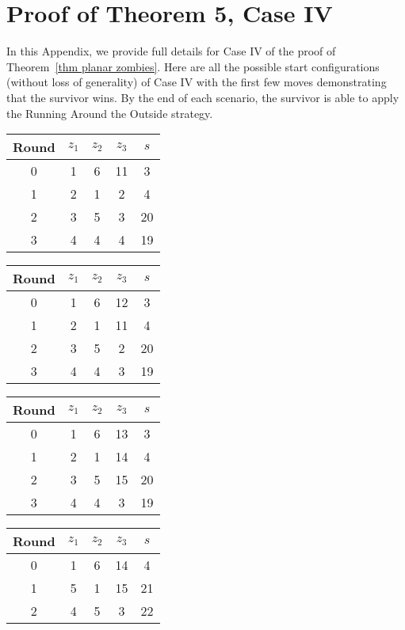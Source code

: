 \chapter{Proof of Theorem 5, Case IV}\label{appendix:planarZombies}

In this Appendix, we provide full details for Case IV of the proof of Theorem~\ref{thm planar zombies}.
Here are all the possible start configurations (without loss of generality) of Case IV with the first few moves demonstrating that the survivor wins.
By the end of each scenario, the survivor is able to apply the Running Around the Outside strategy.

\begin{multicols}{2}

\begin{tabular}{c | c | c | c | c }
Round & $z_1$ & $z_2$ & $z_3$ & $s$ \\
\hline
0 & 1 & 6 & 11 & 3 \\
1 & 2 & 1 & 2 & 4 \\
2 & 3 & 5 & 3 & 20 \\
3 & 4 & 4 & 4 & 19
\end{tabular}


\begin{tabular}{c | c | c | c | c }
Round & $z_1$ & $z_2$ & $z_3$ & $s$ \\
\hline
0 & 1 & 6 & 12 & 3 \\
1 & 2 & 1 & 11 & 4 \\
2 & 3 & 5 & 2 & 20 \\
3 & 4 & 4 & 3 & 19
\end{tabular}


\begin{tabular}{c | c | c | c | c }
Round & $z_1$ & $z_2$ & $z_3$ & $s$ \\
\hline
0 & 1 & 6 & 13 & 3 \\
1 & 2 & 1 & 14 & 4 \\
2 & 3 & 5 & 15 & 20 \\
3 & 4 & 4 & 3 & 19
\end{tabular}


\begin{tabular}{c | c | c | c | c }
Round & $z_1$ & $z_2$ & $z_3$ & $s$ \\
\hline
0 & 1 & 6 & 14 & 4 \\
1 & 5 & 1 & 15 & 21 \\
2 & 4 & 5 & 3 & 22 \\
\end{tabular}



\end{multicols}
